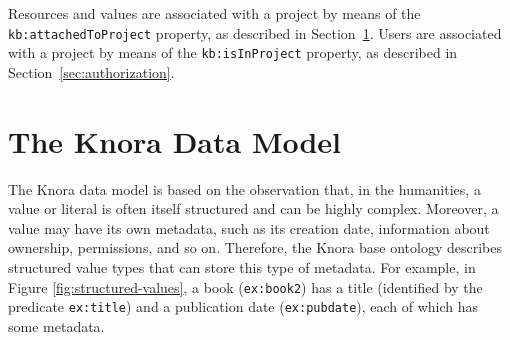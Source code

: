 \documentclass[12pt, a4paper]{article}
\begin{document}
Resources and values are associated with a project by means of the \texttt{kb:attached\-To\-Project} property, as described in Section~\ref{sec:data-model}. Users are associated with a project by means of the \texttt{kb:is\-In\-Project} property, as described in Section~\ref{sec:authorization}.

\section{The Knora Data Model}

\label{sec:data-model}

The Knora data model is based on the observation that, in the humanities, a value or literal is often itself structured and can be highly complex. Moreover, a value may have its own metadata, such as its creation date, information about ownership, permissions, and so on. Therefore, the Knora base ontology describes structured value types that can store this type of metadata. For example, in Figure \ref{fig:structured-values}, a book (\texttt{ex:book2}) has a title (identified by the predicate \texttt{ex:title}) and a publication date (\texttt{ex:pubdate}), each of which has some metadata.
\end{document}
